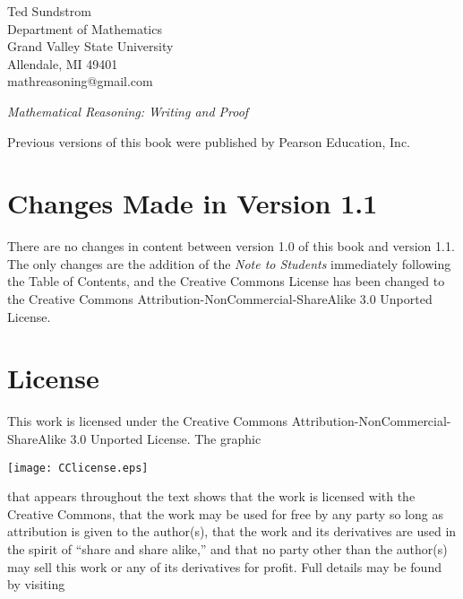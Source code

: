 \newpage
\thispagestyle{empty}

\noindent
Ted Sundstrom \\
Department of Mathematics \\
Grand Valley State University \\
Allendale, MI  49401 \\
mathreasoning@gmail.com


\newpar
\emph{Mathematical Reasoning: Writing and Proof}


\newpar
Previous versions of this book were published by Pearson Education, Inc.

\section*{Changes Made in Version 1.1}
There are no changes in content between version 1.0 of this book and version 1.1.  The only changes are  the addition of the \emph{Note to Students} immediately following the Table of Contents, and the Creative Commons License has been changed to the Creative Commons Attribution-NonCommercial-ShareAlike
3.0 Unported License.

\section*{License}
This work is licensed under the Creative Commons Attribution-NonCommercial-ShareAlike
3.0 Unported License. The graphic
\begin{center}
\texttt{[image: CClicense.eps]}
\end{center}
that appears throughout the text shows that the work is licensed with the Creative Commons, that
the work may be used for free by any party so long as attribution is given to the author(s), that the
work and its derivatives are used in the spirit of ``share and share alike,'' and that no party other than the author(s) may
sell this work or any of its derivatives for profit. Full details may be found by visiting

